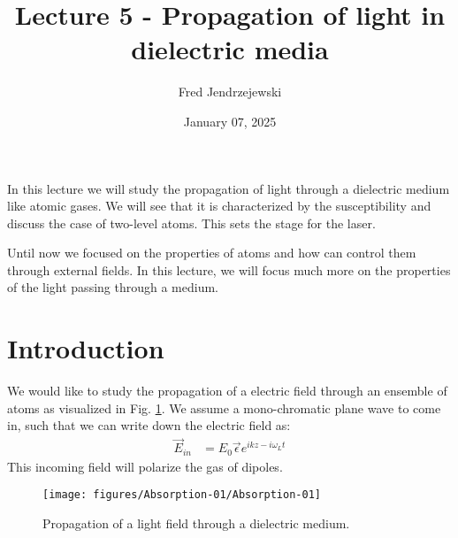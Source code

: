 \documentclass[10pt]{article}
\renewenvironment{abstract}
  {{\bfseries\noindent{\abstractname}\par\nobreak}\footnotesize}
  {\bigskip}
\begin{document}
\title{Lecture 5 - Propagation of light in dielectric media}



\author[1]{Fred Jendrzejewski}%
%


\vspace{-1em}



  
  \date{January 07, 2025}


\begingroup
\let\center\flushleft
\let\endcenter\endflushleft
\maketitle
\endgroup





\begin{abstract}
In this lecture we will study the propagation of light through a dielectric medium like atomic gases. We will see that it is characterized by the susceptibility and discuss the case of two-level atoms. This sets the stage for the laser.%
\end{abstract}%



\sloppy


Until now we focused on the properties of atoms and how can control them through external fields. In this lecture, we will focus much more on the properties of the light passing through a medium.

\section{Introduction}
We would like to study the propagation of a electric field through an ensemble of atoms as visualized in Fig. \ref{881526}. We assume a mono-chromatic plane wave to come in, such that we can write down the electric field as:
\begin{align}
\vec{E}_{in}&= E_0 \vec{\epsilon}e^{i kz -i\omega_L t}
\end{align} 
This incoming field will polarize the gas of dipoles.
\begin{figure}[h!]
\begin{center}
\texttt{[image: figures/Absorption-01/Absorption-01]}
\caption{{Propagation of a light field through a dielectric medium.
{\label{881526}}%
}}
\end{center}
\end{figure}
\end{document}
